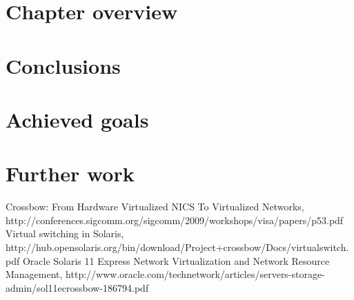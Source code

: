 \documentclass[11pt]{book}
\begin{document}
    \section{Chapter overview}

    \section{Conclusions}

    \section{Achieved goals}

    \section{Further work}


  \begin{thebibliography}{some-label}

    
    \bibitem[1]{} Crossbow: From Hardware Virtualized NICS To Virtualized Networks, http://conferences.sigcomm.org/sigcomm/2009/workshops/visa/papers/p53.pdf
    \bibitem[2]{} Virtual switching in Solaris, http://hub.opensolaris.org/bin/download/Project+crossbow/Docs/virtualswitch.pdf
    \bibitem[3]{} Oracle Solaris 11 Express Network Virtualization and Network Resource Management, http://www.oracle.com/technetwork/articles/servers-storage-admin/sol11ecrossbow-186794.pdf

  \end{thebibliography}
\end{document}
